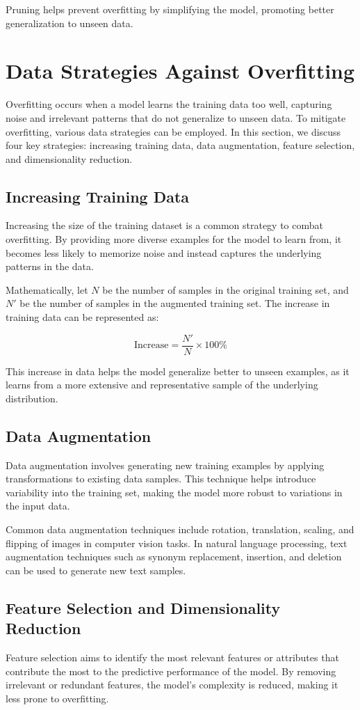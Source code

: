 \documentclass[12pt]{book} %
\begin{document}
Pruning helps prevent overfitting by simplifying the model, promoting better generalization to unseen data.

\section{Data Strategies Against Overfitting}
Overfitting occurs when a model learns the training data too well, capturing noise and irrelevant patterns that do not generalize to unseen data. To mitigate overfitting, various data strategies can be employed. In this section, we discuss four key strategies: increasing training data, data augmentation, feature selection, and dimensionality reduction.

\subsection{Increasing Training Data}
Increasing the size of the training dataset is a common strategy to combat overfitting. By providing more diverse examples for the model to learn from, it becomes less likely to memorize noise and instead captures the underlying patterns in the data.

Mathematically, let \(N\) be the number of samples in the original training set, and \(N'\) be the number of samples in the augmented training set. The increase in training data can be represented as:

\[
\text{Increase} = \frac{N'}{N} \times 100\%
\]

This increase in data helps the model generalize better to unseen examples, as it learns from a more extensive and representative sample of the underlying distribution.

\subsection{Data Augmentation}
Data augmentation involves generating new training examples by applying transformations to existing data samples. This technique helps introduce variability into the training set, making the model more robust to variations in the input data.

Common data augmentation techniques include rotation, translation, scaling, and flipping of images in computer vision tasks. In natural language processing, text augmentation techniques such as synonym replacement, insertion, and deletion can be used to generate new text samples.

\subsection{Feature Selection and Dimensionality Reduction}
Feature selection aims to identify the most relevant features or attributes that contribute the most to the predictive performance of the model. By removing irrelevant or redundant features, the model's complexity is reduced, making it less prone to overfitting.
\end{document}
